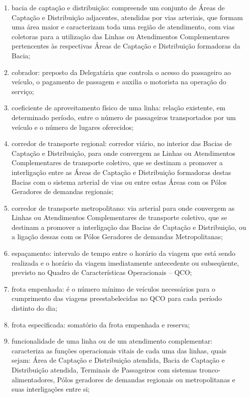 \begin{enumerate}[resume,label=Art. \arabic*]
\begin{enumerate}[label=\roman*.]
\item bacia de captação e distribuição: compreende um conjunto de Áreas de Captação e Distribuição adjacentes, atendidas por vias arteriais, que formam uma área maior e caracterizam toda uma região de atendimento, com vias coletoras para a utilização das Linhas ou Atendimentos Complementares pertencentes às respectivas Áreas de Captação e Distribuição formadoras da Bacia;

\item cobrador: preposto da Delegatária que controla o acesso do passageiro ao veículo, o pagamento de passagem e auxilia o motorista na operação do serviço;

\item coeficiente de aproveitamento físico de uma linha: relação existente, em determinado período, entre o número de passageiros transportados por um veículo e o número de lugares oferecidos;

\item corredor de transporte regional: corredor viário, no interior das Bacias de Captação e Distribuição, para onde convergem as Linhas ou Atendimentos Complementares de transporte coletivo, que se destinam a promover a interligação entre as Áreas de Captação e Distribuição formadoras destas Bacias com o sistema arterial de vias ou entre estas Áreas com os Pólos Geradores de demandas regionais;

\item corredor de transporte metropolitano: via arterial para onde convergem as Linhas ou Atendimentos Complementares de transporte coletivo, que se destinam a promover a interligação das Bacias de Captação e Distribuição, ou a ligação dessas com os Pólos Geradores de demandas Metropolitanas;

\item espaçamento: intervalo de tempo entre o horário da viagem que está sendo realizada e o horário da viagem imediatamente antecedente ou subseqüente, previsto no Quadro de Características Operacionais – QCO;

\item frota empenhada: é o número mínimo de veículos necessários para o cumprimento das viagens preestabelecidas no QCO para cada período distinto do dia;

\item frota especificada: somatório da frota empenhada e reserva;

\item funcionalidade de uma linha ou de um atendimento complementar: caracteriza as funções operacionais vitais de cada uma das linhas, quais sejam: Área de Captação e Distribuição atendida, Bacia de Captação e Distribuição atendida, Terminais de Passageiros com sistemas tronco-alimentadores, Pólos geradores de demandas regionais ou metropolitanas e suas interligações entre si;


\end{enumerate}
\end{enumerate}
